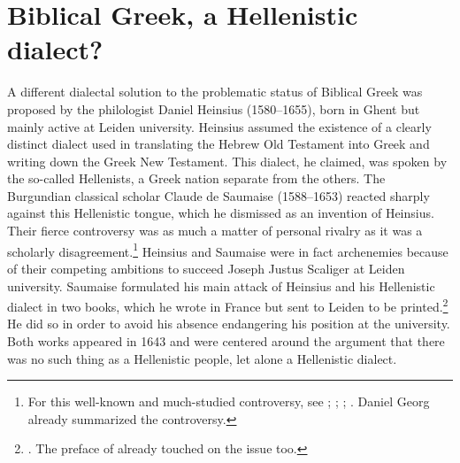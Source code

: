 \section{Biblical Greek, a Hellenistic dialect?}\label{sec:4.6}

A different dialectal solution to the problematic status of Biblical Greek was proposed by the philologist Daniel Heinsius (1580–1655), born in Ghent but mainly active at Leiden university. Heinsius assumed the existence of a clearly distinct dialect used in translating the Hebrew Old Testament into Greek and writing down the Greek New Testament. This dialect, he claimed, was spoken by the so-called Hellenists, a Greek nation separate from the others. The Burgundian classical scholar Claude de Saumaise (1588–1653) reacted sharply against this Hellenistic tongue, which he dismissed as an invention of Heinsius. Their fierce controversy was as much a matter of personal rivalry as it was a scholarly disagreement.\footnote{For this well-known and much-studied controversy, see \citet[32-34]{De1980}; \citet[391-392]{Muller1984}; \citet{Considine2010}; \citet[350-351]{VanHal2010a}. Daniel Georg \citet[\textsc{ii.}74–77]{Morhof1708} already summarized the controversy.} Heinsius and Saumaise were in fact archenemies because of their competing ambitions to succeed Joseph Justus Scaliger at Leiden university. Saumaise formulated his main attack of Heinsius and his Hellenistic dialect in two books, which he wrote in France but sent to Leiden to be printed.\footnote{\citet[]{Saumaise1643a, Saumaise1643}. The preface of \citet{Saumaise1639} already touched on the issue too.} He did so in order to avoid his absence endangering his position at the university. Both works appeared in 1643 and were centered around the argument that there was no such thing as a Hellenistic people, let alone a Hellenistic dialect.

